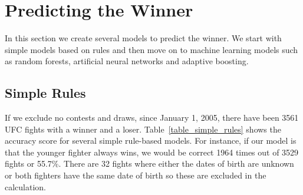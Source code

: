 \clearpage
\section{Predicting the Winner}

In this section we create several models to predict
the winner. We start with simple models based on rules
and then move on to machine learning models such as
random forests, artificial neural networks and
adaptive boosting.

\subsection*{Simple Rules}

If we exclude no contests and draws, since January 1, 2005,
there have been 3561 UFC fights with a winner and a loser.
Table~\ref{table_simple_rules} shows the accuracy score
for several simple rule-based models. For instance, if
our model is that the younger fighter always wins, we would
be correct 1964 times out of 3529 fights or 55.7\%.
There are 32 fights where either the dates of birth
are unknown or both fighters have the same date of birth so
these are excluded in the calculation.

